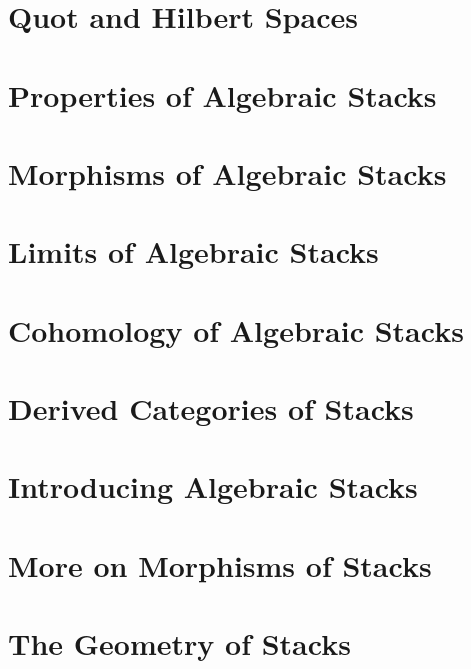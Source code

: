 \chapter{Quot and Hilbert Spaces}
\label{chap:quot}


\chapter{Properties of Algebraic Stacks}
\label{chap:stacks-properties}


\chapter{Morphisms of Algebraic Stacks}
\label{chap:stacks-morphisms}


\chapter{Limits of Algebraic Stacks}
\label{chap:stacks-limits}


\chapter{Cohomology of Algebraic Stacks}
\label{chap:stacks-cohomology}


\chapter{Derived Categories of Stacks}
\label{chap:stacks-perfect}


\chapter{Introducing Algebraic Stacks}
\label{chap:stacks-introduction}


\chapter{More on Morphisms of Stacks}
\label{chap:stacks-more-morphisms}


\chapter{The Geometry of Stacks}
\label{chap:stacks-geometry}

